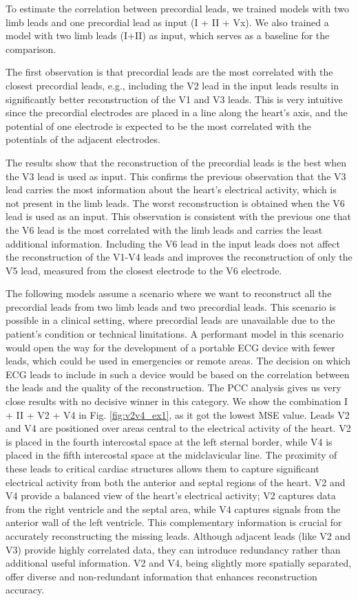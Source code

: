 \documentclass[preprint,12pt]{elsarticle}
\begin{document}
To estimate the correlation between precordial leads, we trained models with two limb leads and one precordial lead as input (I + II + Vx). We also trained a model with two limb leads (I+II) as input, which serves as a baseline for the comparison.

The first observation is that precordial leads are the most correlated with the closest precordial leads, e.g., including the V2 lead in the input leads results in significantly better reconstruction of the V1 and V3 leads. This is very intuitive since the precordial electrodes are placed in a line along the heart's axis, and the potential of one electrode is expected to be the most correlated with the potentials of the adjacent electrodes.

The results show that the reconstruction of the precordial leads is the best when the V3 lead is used as input. This confirms the previous observation that the V3 lead carries the most information about the heart's electrical activity, which is not present in the limb leads. The worst reconstruction is obtained when the V6 lead is used as an input. This observation is consistent with the previous one that the V6 lead is the most correlated with the limb leads and carries the least additional information. Including the V6 lead in the input leads does not affect the reconstruction of the V1-V4 leads and improves the reconstruction of only the V5 lead, measured from the closest electrode to the V6 electrode.

The following models assume a scenario where we want to reconstruct all the precordial leads from two limb leads and two precordial leads. This scenario is possible in a clinical setting, where precordial leads are unavailable due to the patient's condition or technical limitations. A performant model in this scenario would open the way for the development of a portable ECG device with fewer leads, which could be used in emergencies or remote areas. The decision on which ECG leads to include in such a device would be based on the correlation between the leads and the quality of the reconstruction. The PCC analysis gives us very close results with no decisive winner in this category. We show the combination I + II + V2 + V4 in Fig. \ref{fig:v2v4_ex1}, as it got the lowest MSE value. Leads V2 and V4 are positioned over areas central to the electrical activity of the heart. V2 is placed in the fourth intercostal space at the left sternal border, while V4 is placed in the fifth intercostal space at the midclavicular line. The proximity of these leads to critical cardiac structures allows them to capture significant electrical activity from both the anterior and septal regions of the heart. V2 and V4 provide a balanced view of the heart's electrical activity; V2 captures data from the right ventricle and the septal area, while V4 captures signals from the anterior wall of the left ventricle. This complementary information is crucial for accurately reconstructing the missing leads. Although adjacent leads (like V2 and V3) provide highly correlated data, they can introduce redundancy rather than additional useful information. V2 and V4, being slightly more spatially separated, offer diverse and non-redundant information that enhances reconstruction accuracy.
\end{document}
